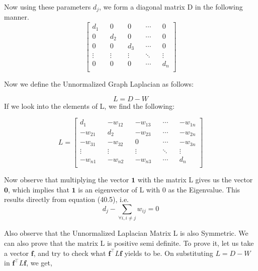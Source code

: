 \documentclass[english]{article}
\theoremstyle{plain}
\begin{document}
Now using these parameters $d_{j}$, we form a diagonal matrix D in the following manner.
\begin{equation}
\begin{bmatrix}
d_{1} && 0 && 0 && \cdots && 0 \\
0 && d_{2} && 0 && \cdots && 0 \\
0 && 0 && d_{3} && \cdots && 0 \\
\vdots && \vdots && \vdots && \ddots && \vdots\\
0 && 0 && 0 && \cdots && d_{n} \\
\end{bmatrix}
\end{equation}

Now we define the Unnormalized Graph Laplacian as follows:

\begin{equation}
L = D - W
\end{equation}
If we look into the elements of L, we find the following:

\begin{equation}
L =
\begin{bmatrix}
d_{1} && -w_{12} && -w_{13} && \cdots && -w_{1n} \\
-w_{21} && d_{2} && -w_{23} && \cdots && -w_{2n} \\
-w_{31} && -w_{32} && 0 && \cdots && -w_{3n} \\
\vdots && \vdots && \vdots && \ddots && \vdots \\
-w_{n1} && -w_{n2} && -w_{n3} && \cdots && d_{n} \\
\end{bmatrix}
\end{equation}

Now observe that multiplying the vector $\boldsymbol{1}$ with the matrix L gives us the vector $\boldsymbol{0}$, which implies that $\boldsymbol{1}$ is an eigenvector of L with 0 as the Eigenvalue. This results directly from equation (40.5), i.e.
\begin{equation}
 d_{j} - \sum_{\forall i, i\neq j} w_{ij} = 0
\end{equation}

Also observe that the Unnormalized Laplacian Matrix L is also Symmetric. We can also prove that the matrix L is positive semi definite. To prove it, let us take a vector $\boldsymbol{f}$, and try to check what $\boldsymbol{f}^{\top}L\boldsymbol{f}$ yields to be. On substituting $L = D-W$ in $\boldsymbol{f}^{\top}L\boldsymbol{f}$, we get,
\end{document}
